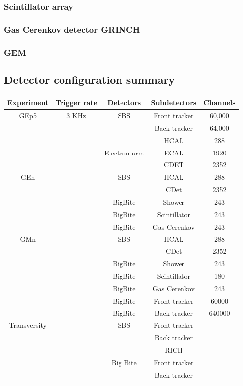 \documentclass{article}
\begin{document}
\subsubsection{Scintillator array}


\subsubsection{Gas Cerenkov detector GRINCH}
\subsubsection{GEM }

\subsection{Detector configuration summary}
\begin{tabular}{|c|c|c|c|c|}
\hline
Experiment&Trigger rate & Detectors & Subdetectors & Channels\\
\hline
GEp5& 3 KHz  & SBS & Front tracker & 60,000\\ 
 && & Back tracker & 64,000\\
 && & HCAL & 288\\
 & & Electron arm& ECAL & 1920 \\ 
 &&              & CDET & 2352 \\ 
\hline
GEn& & SBS & HCAL & 288 \\ 
 &    &   & CDet & 2352 \\ 
 && BigBite& Shower & 243\\ 
 && BigBite& Scintillator & 243\\ 
 && BigBite& Gas Cerenkov & 243\\ 
\hline
GMn& & SBS & HCAL & 288 \\ 
   &  &   & CDet & 2352 \\ 
 && BigBite& Shower & 243\\ 
 && BigBite& Scintillator & 180\\ 
 && BigBite& Gas Cerenkov & 243\\ 
 && BigBite& Front tracker & 60000\\ 
 && BigBite& Back tracker & 640000\\ 
\hline
Transversity && SBS & Front tracker & \\
 &&  & Back tracker & \\
 &&  & RICH & \\
 && Big Bite & Front tracker & \\
 &&  & Back tracker & \\

\end{tabular}
\end{document}
